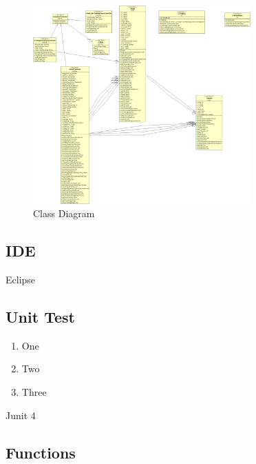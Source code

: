 \documentclass[a4paper,10pt]{article}
\begin{document}
\paragraph{}
\begin{figure}[H]
		\centering
		\includegraphics[height = 3in]{class_diagram.png}
		\caption[Optional caption]{Class Diagram}
		\label{fig:Repository}
	\end{figure}
\paragraph{}

\subsection{IDE} 

Eclipse

\subsection{Unit Test} 
\begin{enumerate}
	\item One
	\item Two
	\item Three
\end{enumerate}
Junit 4
\subsection{Functions} 
\end{document}
